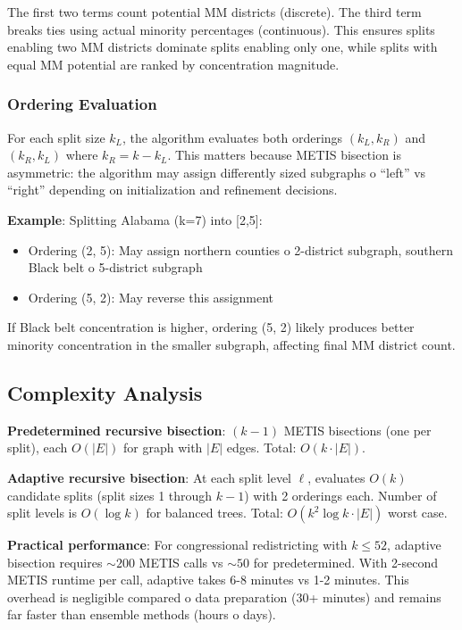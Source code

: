 The first two terms count potential MM districts (discrete). The third term breaks ties using actual minority percentages (continuous). This ensures splits enabling two MM districts dominate splits enabling only one, while splits with equal MM potential are ranked by concentration magnitude.

\subsubsection{Ordering Evaluation}

For each split size $k_L$, the algorithm evaluates both orderings $(k_L, k_R)$ and $(k_R, k_L)$ where $k_R = k - k_L$. This matters because METIS bisection is asymmetric: the algorithm may assign differently sized subgraphs 	o ``left'' vs ``right'' depending on initialization and refinement decisions.

\textbf{Example}: Splitting Alabama (k=7) into [2,5]:
\begin{itemize}
\item Ordering (2, 5): May assign northern counties 	o 2-district subgraph, southern Black belt 	o 5-district subgraph
\item Ordering (5, 2): May reverse this assignment
\end{itemize}

If Black belt concentration is higher, ordering (5, 2) likely produces better minority concentration in the smaller subgraph, affecting final MM district count.

\subsection{Complexity Analysis}

\textbf{Predetermined recursive bisection}: $(k-1)$ METIS bisections (one per split), each $O(|E|)$ for graph with $|E|$ edges. Total: $O(k \cdot |E|)$.

\textbf{Adaptive recursive bisection}: At each split level $\ell$, evaluates $O(k)$ candidate splits (split sizes 1 through $k-1$) with 2 orderings each. Number of split levels is $O(\log k)$ for balanced trees. Total: $O(k^2 \log k \cdot |E|)$ worst case.

\textbf{Practical performance}: For congressional redistricting with $k \leq 52$, adaptive bisection requires $\sim 200$ METIS calls vs $\sim 50$ for predetermined. With 2-second METIS runtime per call, adaptive takes 6-8 minutes vs 1-2 minutes. This overhead is negligible compared 	o data preparation (30+ minutes) and remains far faster than ensemble methods (hours 	o days).

